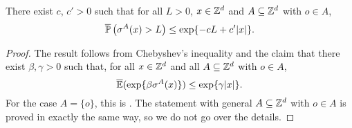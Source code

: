 
\begin{lemma}
	\label{cor20}
There exist $c$, $c' > 0$ such that for all $L > 0$, $x \in {\mathbb{Z}^d}$ and $A \subseteq {\mathbb{Z}^d}$ with $o \in A$,
\begin{align}\label{eqcor20}
\overline{\mathbb{P}}\left(\sigma^A(x) > L\right) \leq \exp\{-cL + c'|x|\}.
\end{align}
\end{lemma}
\begin{proof}
The result follows from Chebyshev's inequality and the claim that there exist $\beta, \gamma > 0$ such that, for all $x \in {\mathbb{Z}^d}$ and all $A \subseteq {\mathbb{Z}^d}$ with $o \in A$,
$$\overline{\mathbb{E}}(\exp\{\beta \sigma^A(x)\}) \leq \exp\{\gamma |x|\}. $$
	For the case $A = \{o\}$, this is \cite[Theorem 15]{GaretMarch14}. The statement with general $A \subseteq {\mathbb{Z}^d}$ with $o \in A$ is proved in exactly the same way, so we do not go over the details.
\end{proof}


